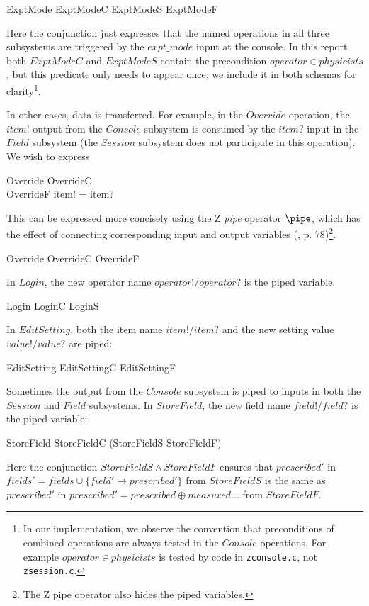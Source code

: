 \begin{zed} ExptMode  ExptModeC \land ExptModeS \land ExptModeF \end{zed}
Here the conjunction just expresses that the named operations in all
three subsystems are triggered by the $expt\_mode$ input at the
console.  In this report both $ExptModeC$ and $ExptModeS$ contain the
precondition $operator \in physicists$, but this predicate only needs
to appear once; we include it in both schemas for clarity\footnote{In our
implementation, we observe the convention that preconditions of
combined operations are always tested in the $Console$
operations.  For example $operator \in physicists$
is tested by code in {\tt zconsole.c}, not {\tt zsession.c}.}.

In other cases, data is transferred.  For example, in the $Override$
operation, the $item!$ output from the $Console$ subsystem is
consumed by the $item?$ input in the $Field$ subsystem (the $Session$
subsystem does not participate in this operation).  We wish to
express

\begin{schema}{Override}
	OverrideC \\
	OverrideF
\where
	item! = item?
\end{schema}
This can be expressed more concisely using the Z {\em pipe} operator
$\pipe$, which has the effect of connecting corresponding input and
output variables (\cite{spivey92}, p. 78)\footnote{The Z pipe operator
also hides the piped variables.}.

\begin{zed} Override  OverrideC \pipe OverrideF \end{zed}
In $Login$, the new operator name $operator!/operator?$ is the piped variable.

\begin{zed} Login  LoginC \pipe LoginS \end{zed}
In $EditSetting$, both the item name $item!/item?$ and the
new setting value $value!/value?$ are piped:

\begin{zed} EditSetting  EditSettingC \pipe EditSettingF \end{zed}
Sometimes the output from the $Console$ subsystem is piped to inputs in
both the $Session$ and $Field$ subsystems.  In $StoreField$, the new
field name $field! / field?$ is the piped variable:

\begin{zed} 
	StoreField  StoreFieldC \pipe (StoreFieldS \land StoreFieldF)
\end{zed}
Here the conjunction $StoreFieldS \land StoreFieldF$ ensures that
$prescribed'$ in $fields' = fields \cup \{ field' \mapsto prescribed' \}$ 
from $StoreFieldS$ is the same as $prescribed'$ in
$prescribed' = prescribed \oplus  measured \dots$ from $StoreFieldF$.

